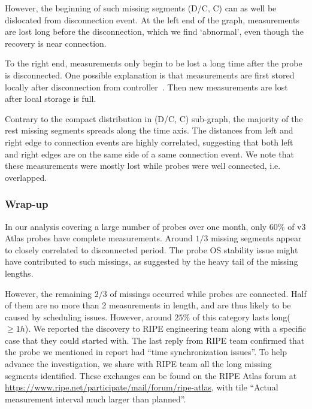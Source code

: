 However, the beginning of such missing segments (D/C, C) can as well be dislocated from disconnection event.
At the left end of the graph, measurements are lost long before the disconnection, which we find `abnormal', even though the recovery is near connection.

To the right end, measurements only begin to be lost a long time after the probe is disconnected. One possible explanation is that measurements are first stored locally after disconnection from controller~\cite{usb}. Then new measurements are lost after local storage is full.

Contrary to the compact distribution in (D/C, C) sub-graph, the majority of the rest missing segments spreads along the time axis. 
The distances from left and right edge to connection events are highly correlated, suggesting that both left and right edges are on the same side of a same connection event.
We note that these measurements were mostly lost while probes were well connected, i.e. overlapped.

\subsubsection*{Wrap-up}
In our analysis covering a large number of probes over one month, only 60\% of v3 Atlas probes have complete measurements. Around $1/3$ missing segments appear to closely correlated to disconnected period. The probe OS stability issue might have contributed to such missings, as suggested by the heavy tail of the missing lengths.

However, the remaining $2/3$ of missings occurred while probes are connected. 
Half of them are no more than 2 measurements in length, and are thus likely to be caused by scheduling issues. However, around $25\%$ of this category lasts long($\geq 1h$). 
We reported the discovery to RIPE engineering team along with a specific case that they could started with.
The last reply from RIPE team confirmed  that the probe we mentioned in report had ``time synchronization issues''. To help advance the investigation, we share with RIPE team all the long missing segments identified. These exchanges can be found on the RIPE Atlas forum at \url{https://www.ripe.net/participate/mail/forum/ripe-atlas}, with tile ``Actual measurement interval much larger than planned''.

